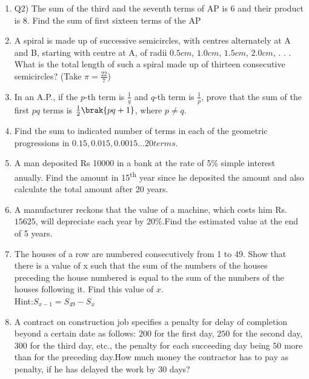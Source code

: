 \begin{enumerate}[label=\thechapter.\arabic*,ref=\thechapter.\theenumi]
\item Q2) The sum of the third and the seventh terms of AP is 6 and their product is 8. Find the sum of first sixteen terms of the AP \\
\solution 
\pagebreak
\item A spiral is made up of successive semicircles, with centres alternately at A and B, starting with centre at A, of radii $0.5 cm$, $1.0 cm$, $1.5 cm$, $2.0 cm$, . . . What is the total length of such a spiral made up of thirteen consecutive semicircles? (Take $\pi = \frac{22}{7}$)\\
\solution

\newpage
\item In an A.P., if the $p$-th term is $\frac{1}{q}$ and $q$-th term is $\frac{1}{p}$, prove that the sum of the first $pq$ terms is $\frac{1}{2}\brak{pq + 1}$, where $p \neq q$.
\solution
\pagebreak

\item Find the sum to indicated number of terms in each of the geometric progressions in
$0.15, 0.015, 0.0015\ldots 20 terms$.\\
\solution

\pagebreak

\item A man deposited Rs 10000 in a bank at the rate of 5\% simple interest anually. Find the amount in 15\textsuperscript{th} year since he deposited the amount and also calculate the total amount after 20 years.\\
\solution

\pagebreak
\item A manufacturer reckons that the value of a machine, which costs him Rs.$15625$, will depreciate each year by $20\%$.Find the estimated value at the end of 5 years.\\
\solution

\pagebreak


\item The houses of a row are numbered consecutively from 1 to 49. Show that there is a value
of x such that the sum of the numbers of the houses preceding the house numbered is equal to the sum of the numbers of the houses following it. Find this value of $x$.\\
Hint:$ S_{x-1}=S_{49}-S_x$\\
\solution

\pagebreak

\item A contract on construction job specifies a penalty for delay of completion beyond a certain date as follows: \rupee $200$ for the first day, \rupee $250$ for the second day, \rupee $300$ for the third day, etc., the penalty for each succeeding day being \rupee $50$ more than for the preceding day.How much money the contractor has to pay as penalty, if he has delayed the work by $30$ days?\\


\end{enumerate}
